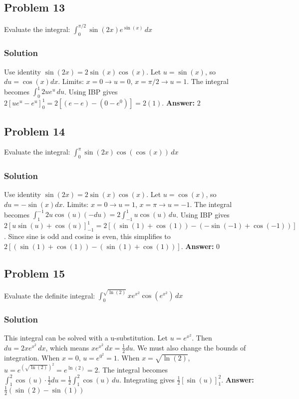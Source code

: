 \documentclass{article}
\begin{document}
\subsection{Problem 13}
Evaluate the integral: $ \int_{0}^{\pi/2} \sin(2x) e^{\sin(x)} \,dx $
\subsubsection*{Solution}
Use identity $\sin(2x) = 2\sin(x)\cos(x)$. Let $u=\sin(x)$, so $du=\cos(x)dx$.
Limits: $x=0 \to u=0$, $x=\pi/2 \to u=1$.
The integral becomes $ \int_{0}^{1} 2u e^u \,du $.
Using IBP gives $ 2[ue^u - e^u]_{0}^{1} = 2[(e-e) - (0-e^0)] = 2(1) $.
\textbf{Answer:} $ 2 $


\subsection{Problem 14}
Evaluate the integral: $ \int_{0}^{\pi} \sin(2x) \cos(\cos(x)) \,dx $
\subsubsection*{Solution}
Use identity $\sin(2x) = 2\sin(x)\cos(x)$. Let $u=\cos(x)$, so $du=-\sin(x)dx$.
Limits: $x=0 \to u=1$, $x=\pi \to u=-1$.
The integral becomes $ \int_{1}^{-1} 2u \cos(u) (-du) = 2\int_{-1}^{1} u \cos(u) \,du $.
Using IBP gives $ 2[u\sin(u) + \cos(u)]_{-1}^{1} = 2[(\sin(1)+\cos(1)) - (-\sin(-1)+\cos(-1))] $.
Since sine is odd and cosine is even, this simplifies to $ 2[(\sin(1)+\cos(1)) - (\sin(1)+\cos(1))] $.
\textbf{Answer:} $ 0 $

\subsection{Problem 15}
Evaluate the definite integral: $ \int_{0}^{\sqrt{\ln(2)}} x e^{x^2} \cos(e^{x^2}) \,dx $
\subsubsection*{Solution}
This integral can be solved with a u-substitution.
Let $u = e^{x^2}$. Then $du = 2x e^{x^2} \,dx$, which means $x e^{x^2} \,dx = \frac{1}{2}du$.
We must also change the bounds of integration.
When $x=0$, $u = e^{0^2} = 1$.
When $x=\sqrt{\ln(2)}$, $u = e^{(\sqrt{\ln(2)})^2} = e^{\ln(2)} = 2$.
The integral becomes $ \int_{1}^{2} \cos(u) \cdot \frac{1}{2}du = \frac{1}{2} \int_{1}^{2} \cos(u) \,du $.
Integrating gives $ \frac{1}{2} [\sin(u)]_{1}^{2} $.
\textbf{Answer:} $ \frac{1}{2}(\sin(2) - \sin(1)) $
\end{document}
